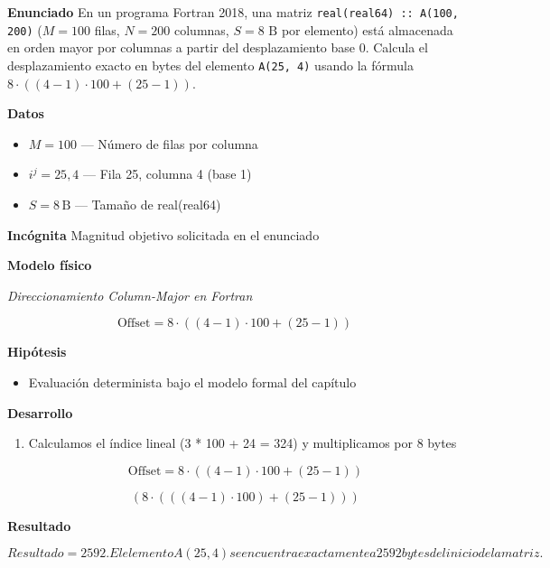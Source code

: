 \documentclass{book}
\begin{document}
\begin{tcolorbox}[title={Problema resuelto}, studiumworked, breakable]

\noindent\textbf{Enunciado}
En un programa Fortran 2018, una matriz \texttt{real(real64) :: A(100, 200)} (\(M = 100\) filas, \(N = 200\) columnas, \(S = 8\text{ B}\) por elemento) está almacenada en orden mayor por columnas a partir del desplazamiento base \(0\). Calcula el desplazamiento exacto en bytes del elemento \texttt{A(25, 4)} usando la fórmula \(8 \cdot ((4 - 1) \cdot 100 + (25 - 1))\).

\noindent\textbf{Datos}
\begin{itemize}
\item $M = 100$ — Número de filas por columna
\item $i^{j} = 25, 4$ — Fila 25, columna 4 (base 1)
\item $S = 8\,\mathrm{B}$ — Tamaño de real(real64)
\end{itemize}

\noindent\textbf{Incógnita}
Magnitud objetivo solicitada en el enunciado

\noindent\textbf{Modelo físico}

\noindent\textit{Direccionamiento Column-Major en Fortran}

\[
\text{Offset} = 8 \cdot ((4 - 1) \cdot 100 + (25 - 1))
\]

\noindent\textbf{Hipótesis}
\begin{itemize}
\item Evaluación determinista bajo el modelo formal del capítulo
\end{itemize}

\noindent\textbf{Desarrollo}
\begin{enumerate}
\item
Calculamos el índice lineal (3 * 100 + 24 = 324) y multiplicamos por 8 bytes

\[
\text{Offset} = 8 \cdot ((4 - 1) \cdot 100 + (25 - 1))
\]

\[
\left(8\cdot \left(\left(\left(4-1\right)\cdot 100\right)+\left(25-1\right)\right)\right)
\]
\end{enumerate}

\noindent\textbf{Resultado}

\[
Resultado = 2592. El elemento A(25, 4) se encuentra exactamente a 2592 bytes del inicio de la matriz.
\]


\end{tcolorbox}
\end{document}
